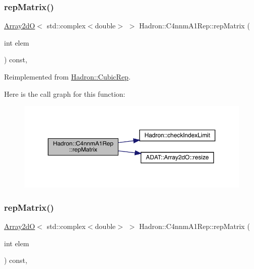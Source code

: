 \subsubsection{\texorpdfstring{repMatrix()}{repMatrix()}\hspace{0.1cm}{\footnotesize\ttfamily [1/2]}}
{\footnotesize\ttfamily \mbox{\hyperlink{classADAT_1_1Array2dO}{Array2dO}}$<$ std\+::complex$<$double$>$ $>$ Hadron\+::\+C4nnm\+A1\+Rep\+::rep\+Matrix (\begin{DoxyParamCaption}\item[{int}]{elem }\end{DoxyParamCaption}) const\hspace{0.3cm}{\ttfamily [inline]}, {\ttfamily [virtual]}}



Reimplemented from \mbox{\hyperlink{structHadron_1_1CubicRep_ac5d7e9e6f4ab1158b5fce3e4ad9e8005}{Hadron\+::\+Cubic\+Rep}}.

Here is the call graph for this function\+:
\nopagebreak
\begin{figure}[H]
\begin{center}
\leavevmode
\includegraphics[width=350pt]{d4/dbc/structHadron_1_1C4nnmA1Rep_afd420b29cea68de99ec5e175a42bafc7_cgraph}
\end{center}
\end{figure}
\mbox{\label{structHadron_1_1C4nnmA1Rep_afd420b29cea68de99ec5e175a42bafc7}} 
\subsubsection{\texorpdfstring{repMatrix()}{repMatrix()}\hspace{0.1cm}{\footnotesize\ttfamily [2/2]}}
{\footnotesize\ttfamily \mbox{\hyperlink{classADAT_1_1Array2dO}{Array2dO}}$<$ std\+::complex$<$double$>$ $>$ Hadron\+::\+C4nnm\+A1\+Rep\+::rep\+Matrix (\begin{DoxyParamCaption}\item[{int}]{elem }\end{DoxyParamCaption}) const\hspace{0.3cm}{\ttfamily [inline]}, {\ttfamily [virtual]}}



